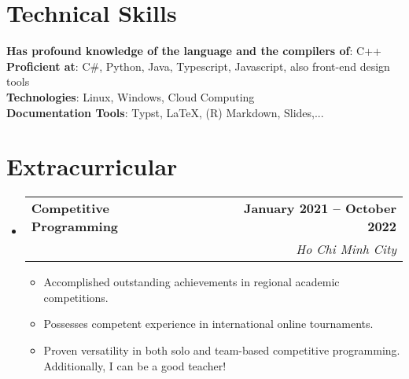 \documentclass[letterpaper,11pt]{article}
\makeatletter
\newcommand{\resumeItem}[1]{
\item\small{
{#1 \vspace{-2pt}}
}
}
\newcommand{\resumeSubheading}[4]{
\vspace{-2pt}\item
\begin{tabular*}{1.0\textwidth}[t]{l@{\extracolsep{\fill}}r}
\textbf{#1} & \textbf{\small #2} \\
\textit{\small#3} & \textit{\small #4} \\
    \end{tabular*}\vspace{-7pt}
}
\newcommand{\resumeSubHeadingListStart}{\begin{itemize}[leftmargin=0.0in, label={}]}
\newcommand{\resumeSubHeadingListEnd}{\end{itemize}}
\newcommand{\resumeItemListStart}{\begin{itemize}}
\newcommand{\resumeItemListEnd}{\end{itemize}\vspace{-5pt}}
\makeatother
\begin{document}
\section{Technical Skills}
\begin{itemize}[leftmargin=0.15in, label={}]
\small{\item{
\textbf{Has profound knowledge of the language and the compilers of}{: C++} \\
\textbf{Proficient at}{: C\#, Python, Java, Typescript, Javascript, also front-end design tools} \\
\textbf{Technologies}{: Linux, Windows, Cloud Computing} \\
\textbf{Documentation Tools}{: Typst, LaTeX, (R) Markdown, Slides,...} \\
}}
\end{itemize}
\vspace{-16pt}


\section{Extracurricular}
\resumeSubHeadingListStart
\resumeSubheading{Competitive Programming}{January 2021 -- October 2022}{}{Ho Chi Minh City}
\resumeItemListStart
\resumeItem{Accomplished outstanding achievements in regional academic competitions.}
\resumeItem{Possesses competent experience in international online tournaments.}
\resumeItem{Proven versatility in both solo and team-based competitive programming. Additionally, I can be a good teacher!}
\resumeItemListEnd
\resumeSubHeadingListEnd
\end{document}
